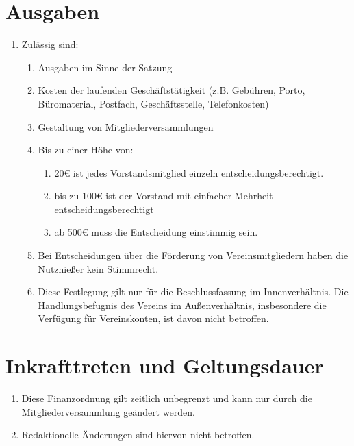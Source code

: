 \documentclass[12pt,a4paper,titlepage]{scrartcl}
\begin{document}
\section{Ausgaben}
\begin{enumerate}
\item Zulässig sind:
	\begin{enumerate}
	\item Ausgaben im Sinne der Satzung 
	\item Kosten der laufenden Geschäftstätigkeit (z.B. Gebühren, Porto, Büromaterial, 
Postfach, Geschäftsstelle, Telefonkosten) 
	\item Gestaltung von Mitgliederversammlungen 
	\item Bis zu einer Höhe von:
		\begin{enumerate}
		\item 20€ ist jedes Vorstandsmitglied einzeln entscheidungsberechtigt. 
		\item bis zu 100€ ist der Vorstand mit einfacher Mehrheit entscheidungsberechtigt 
		\item ab 500€ muss die Entscheidung einstimmig sein.
		\end{enumerate}
	\item Bei Entscheidungen über die Förderung von Vereinsmitgliedern haben die 
Nutznießer kein Stimmrecht. 
	\item Diese Festlegung gilt nur für die Beschlussfassung im Innenverhältnis. Die 
Handlungsbefugnis des Vereins im Außenverhältnis, insbesondere die Verfügung für 
Vereinskonten, ist davon nicht betroffen.
	\end{enumerate}
\end{enumerate}
 
\section{Inkrafttreten und Geltungsdauer }
\begin{enumerate}
\item Diese Finanzordnung gilt zeitlich unbegrenzt und kann nur durch die 
Mitgliederversammlung geändert werden. 
\item Redaktionelle Änderungen sind hiervon nicht betroffen. 
\end{enumerate}
\end{document}
